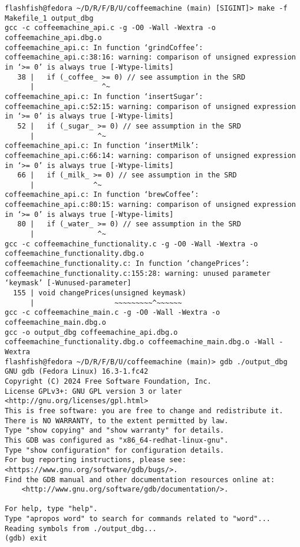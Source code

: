 \documentclass{report}
\begin{document}
\begin{lstlisting}[style=cppstyle, title=\texttt{Terminal Output}]
flashfish@fedora ~/D/R/F/B/U/coffeemachine (main) [SIGINT]> make -f Makefile_1 output_dbg
gcc -c coffeemachine_api.c -g -O0 -Wall -Wextra -o coffeemachine_api.dbg.o
coffeemachine_api.c: In function ‘grindCoffee’:
coffeemachine_api.c:38:16: warning: comparison of unsigned expression in ‘>= 0’ is always true [-Wtype-limits]
   38 |   if (_coffee_ >= 0) // see assumption in the SRD
      |                ^~
coffeemachine_api.c: In function ‘insertSugar’:
coffeemachine_api.c:52:15: warning: comparison of unsigned expression in ‘>= 0’ is always true [-Wtype-limits]
   52 |   if (_sugar_ >= 0) // see assumption in the SRD
      |               ^~
coffeemachine_api.c: In function ‘insertMilk’:
coffeemachine_api.c:66:14: warning: comparison of unsigned expression in ‘>= 0’ is always true [-Wtype-limits]
   66 |   if (_milk_ >= 0) // see assumption in the SRD
      |              ^~
coffeemachine_api.c: In function ‘brewCoffee’:
coffeemachine_api.c:80:15: warning: comparison of unsigned expression in ‘>= 0’ is always true [-Wtype-limits]
   80 |   if (_water_ >= 0) // see assumption in the SRD
      |               ^~
gcc -c coffeemachine_functionality.c -g -O0 -Wall -Wextra -o coffeemachine_functionality.dbg.o
coffeemachine_functionality.c: In function ‘changePrices’:
coffeemachine_functionality.c:155:28: warning: unused parameter ‘keymask’ [-Wunused-parameter]
  155 | void changePrices(unsigned keymask)
      |                   ~~~~~~~~~^~~~~~~
gcc -c coffeemachine_main.c -g -O0 -Wall -Wextra -o coffeemachine_main.dbg.o
gcc -o output_dbg coffeemachine_api.dbg.o coffeemachine_functionality.dbg.o coffeemachine_main.dbg.o -Wall -Wextra
flashfish@fedora ~/D/R/F/B/U/coffeemachine (main)> gdb ./output_dbg
GNU gdb (Fedora Linux) 16.3-1.fc42
Copyright (C) 2024 Free Software Foundation, Inc.
License GPLv3+: GNU GPL version 3 or later <http://gnu.org/licenses/gpl.html>
This is free software: you are free to change and redistribute it.
There is NO WARRANTY, to the extent permitted by law.
Type "show copying" and "show warranty" for details.
This GDB was configured as "x86_64-redhat-linux-gnu".
Type "show configuration" for configuration details.
For bug reporting instructions, please see:
<https://www.gnu.org/software/gdb/bugs/>.
Find the GDB manual and other documentation resources online at:
    <http://www.gnu.org/software/gdb/documentation/>.

For help, type "help".
Type "apropos word" to search for commands related to "word"...
Reading symbols from ./output_dbg...
(gdb) exit
\end{lstlisting}
\end{document}
